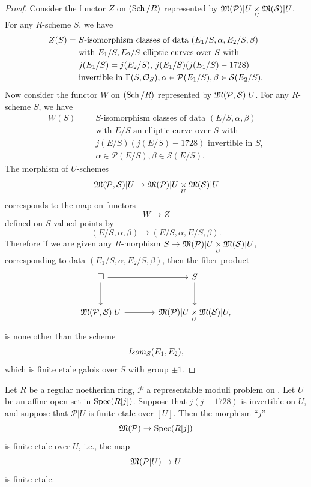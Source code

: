 \begin{proof}
Consider the functor $Z$ on $(\operatorname{Sch}/R)$ represented by $\mathfrak{M}(\mathcal{P})|U \underset{U}{\times} \mathfrak{M}(\mathcal{S})|U$. For any $R$-scheme $S$, we have
\[
\begin{aligned}
Z(S) =\ &\text{$S$-isomorphism classes of data } (E_1/S, \alpha, E_2/S, \beta) \\
&\text{with } E_1/S, E_2/S \text{ elliptic curves over } S \text{ with} \\
&\text{$j(E_1/S) = j(E_2/S)$, $j(E_1/S)(j(E_1/S) - 1728)$} \\
&\text{invertible in } \Gamma(S, \mathcal{O}_S), \alpha \in \mathcal{P}(E_1/S), \beta \in \mathcal{S}(E_2/S).
\end{aligned}
\]
Now consider the functor $W$ on $(\operatorname{Sch}/R)$ represented by $\mathfrak{M}(\mathcal{P}, \mathcal{S})|U$. For any $R$-scheme $S$, we have
\[
\begin{aligned}
W(S) =\ &\text{$S$-isomorphism classes of data } (E/S, \alpha, \beta) \\
&\text{with } E/S \text{ an elliptic curve over } S \text{ with} \\
&\text{$j(E/S)(j(E/S) - 1728)$ invertible in } S, \\
&\alpha \in \mathcal{P}(E/S), \beta \in \mathcal{S}(E/S).
\end{aligned}
\]
The morphism of $U$-schemes
\[
\mathfrak{M}(\mathcal{P}, \mathcal{S})|U \to \mathfrak{M}(\mathcal{P})|U \underset{U}{\times} \mathfrak{M}(\mathcal{S})|U
\]
corresponds to the map on functors
\[
W \to Z
\]
defined on $S$-valued points by
\[
(E/S, \alpha, \beta) \mapsto (E/S, \alpha, E/S, \beta) .
\]
Therefore if we are given any $R$-morphism $S \to \mathfrak{M}(\mathcal{P})|U \underset{U}{\times} \mathfrak{M}(\mathcal{S})|U$, corresponding to data $(E_1/S, \alpha, E_2/S, \beta)$, then the fiber product
\[
\begin{tikzcd}[column sep=large, row sep=large]
\square \arrow[r] \arrow[d] & S \arrow[d] \\
\Mfrak(\mathcal{P}, \mathcal{S})|U \arrow[r] & \Mfrak(\mathcal{P})|U \fib{U} \Mfrak(\mathcal{S})|U ,
\end{tikzcd}
\]
is none other than the scheme
\[
\mathit{Isom}_S(E_1, E_2) ,
\]
which is finite etale galois over $S$ with group $\pm 1$.
\end{proof}

\begin{kcor}\label{cor:8.4.5}
Let $R$ be a regular noetherian ring, $\mathcal{P}$ a representable moduli problem on \EllR. Let $U$ be an affine open set in $\operatorname{Spec}(R[j])$. Suppose that $j(j-1728)$ is invertible on $U$, and suppose that $\mathcal{P}|U$ is finite etale over $[U]$. Then the morphism ``$j$''
\[
\mathfrak{M}(\mathcal{P}) \to \operatorname{Spec}(R[j])
\]
is finite etale over $U$, i.e., the map
\[
\mathfrak{M}(\mathcal{P}|U) \to U
\]
is finite etale.
\end{kcor}

